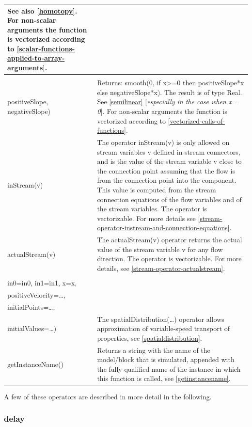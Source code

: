 \documentclass[10pt,a4paper]{report}
\def\doublelabel#1{\label{#1}}
\begin{document}
\begin{longtable}{|p{5.1cm}|p{8cm}|}
See also \ref{homotopy}. For non-scalar arguments the function is
vectorized according to \ref{scalar-functions-applied-to-array-arguments}.\\ \hline
\begin{tabular}{@{}p{5.1cm}@{}}
semiLinear(x,\\
positiveSlope,
negativeSlope) 
\end{tabular}& 
Returns:
smooth(0, if x\textgreater{}=0 then positiveSlope*x else
negativeSlope*x).
The result is of type Real. See \ref{semilinear} {[}\emph{especially in
the case when x = 0}{]}\emph{.} For non-scalar arguments the function is
vectorized according to \ref{vectorized-calls-of-functions}.\\ \hline
inStream(v) & The operator inStream(v) is only allowed on stream
variables v defined in stream connectors, and is the value of the stream
variable v close to the connection point assuming that the flow is from
the connection point into the component. This value is computed from the
stream connection equations of the flow variables and of the stream
variables. The operator is vectorizable. For more details see \ref{stream-operator-instream-and-connection-equations}.\\ \hline
actualStream(v) & The actualStream(v) operator returns the actual value
of the stream variable v for any flow direction. The operator is
vectorizable. For more details, see \ref{stream-operator-actualstream}.\\ \hline
\begin{tabular}{@{}p{5.1cm}@{}}
spatialDistribution(\\
in0=in0, in1=in1, x=x,\\
positiveVelocity=\ldots{},\\
initialPoints=\ldots{},\\
initialValues=\ldots{})
\end{tabular} & 
The spatialDistribution(\ldots{}) operator allows approximation of
variable-speed transport of properties, see \ref{spatialdistribution}.\\ \hline
getInstanceName() & Returns a string with the name of the model/block
that is simulated, appended with the fully qualified name of the
instance in which this function is called, see \ref{getinstancename}.\\ \hline
\end{longtable}

A few of these operators are described in more detail in the following.

\subsubsection{delay}\doublelabel{delay}
\end{document}
